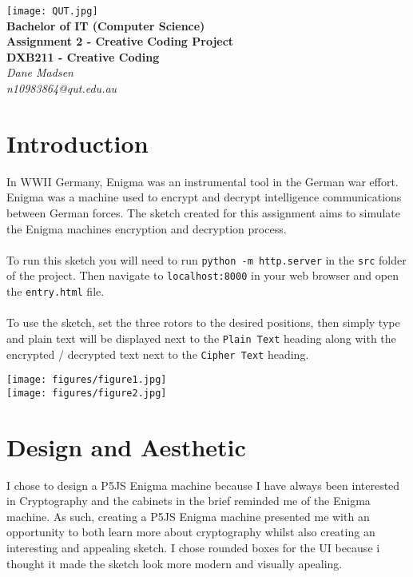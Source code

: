 \documentclass[12pt,a4paper]{article}
\begin{document}
	\begin{titlepage}
		
		\begin{center}
			\texttt{[image: QUT.jpg]}\\
			[0.03\textheight]  
			\Large\textbf{Bachelor of IT (Computer Science)}\\
			\Large\textbf{Assignment 2 - Creative Coding Project}\\
			\large\textbf{DXB211 - Creative Coding}\\
			[0.02\textheight]
			\large\textsl{Dane Madsen}\\
			\large\textsl{n10983864@qut.edu.au}
		\end{center}
		
	\end{titlepage}
	\tableofcontents
	\newpage

	\section{Introduction}
		In WWII Germany, Enigma was an instrumental tool in the German war effort. 
		Enigma was a machine used to encrypt and decrypt intelligence communications 
		between German forces. The sketch created for this assignment aims to simulate 
		the Enigma machines encryption and decryption process.\\
		\\
		To run this sketch you will need to run \texttt{python -m http.server} in the 
		\texttt{src} folder of the project. Then navigate to \texttt{localhost:8000} 
		in your web browser and open the \texttt{entry.html} file.\\
		\\
		To use the sketch, set the three rotors to the desired positions, then simply 
		type and plain text will be displayed next to the \texttt{Plain Text} heading along 
		with the encrypted / decrypted text next to the \texttt{Cipher Text} heading.\\

		\begin{center}
			\texttt{[image: figures/figure1.jpg]}\\
			\vspace{0.5cm}
			\texttt{[image: figures/figure2.jpg]}\\
		\end{center}
	
	\newpage

	\section{Design and Aesthetic}
		I chose to design a P5JS Enigma machine because I have always been interested 
		in Cryptography and the cabinets in the brief reminded me of the Enigma machine. 
		As such, creating a P5JS Enigma machine presented me with an opportunity to 
		both learn more about cryptography whilst also creating an interesting and appealing 
		sketch. I chose rounded boxes for the UI because i thought it made the sketch look 
		more modern and visually apealing.\\
\end{document}
